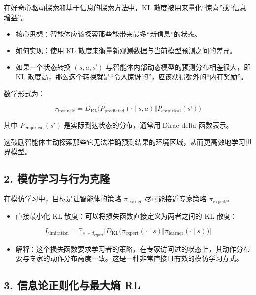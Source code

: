 在好奇心驱动探索和基于信息的探索方法中，KL 散度被用来量化``惊喜''或``信息增益''。

\begin{itemize}
\tightlist
\item
  核心思想：智能体应该探索那些能带来最多``新信息''的状态。
\item
  如何实现：使用 KL 散度来衡量新观测数据与当前模型预测之间的差异。
\item
  如果一个状态转换 \((s,a,s')\) 与智能体内部动态模型的预测分布相差很大，即 KL 散度高，那么这个转换就是``令人惊讶的''，应该获得额外的``内在奖励''。
\end{itemize}

数学形式为：

\[
r_{\mathrm{intrinsic}}
=
D_{\mathrm{KL}}\bigl(
P_{\mathrm{predicted}}(\cdot\mid s,a)
\Vert
P_{\mathrm{empirical}}(s')
\bigr)
\]

其中 \(P_{\mathrm{empirical}}(s')\) 是实际到达状态的分布，通常用 Dirac delta 函数表示。

这鼓励智能体主动探索那些它无法准确预测结果的环境区域，从而更高效地学习世界模型。

\hypertarget{ux6a21ux4effux5b66ux4e60ux4e0eux884cux4e3aux514bux9686}{%
\subsection{2. 模仿学习与行为克隆}\label{ux6a21ux4effux5b66ux4e60ux4e0eux884cux4e3aux514bux9686}}

在模仿学习中，目标是让智能体的策略 \(\pi_{\mathrm{learner}}\) 尽可能接近专家策略 \(\pi_{\mathrm{expert}}\)。

\begin{itemize}
\tightlist
\item
  直接最小化 KL 散度：可以将损失函数直接定义为两者之间的 KL 散度：
\end{itemize}

\[
L_{\mathrm{imitation}}
=
\mathbb{E}_{s\sim d_{\mathrm{expert}}}
\bigl[
D_{\mathrm{KL}}\bigl(
\pi_{\mathrm{expert}}(\cdot\mid s)
\Vert
\pi_{\mathrm{learner}}(\cdot\mid s)
\bigr)
\bigr]
\]

\begin{itemize}
\tightlist
\item
  解释：这个损失函数要求学习者的策略，在专家访问过的状态上，其动作分布要与专家的动作分布高度一致。这是一种非常直接且有效的模仿学习方式。
\end{itemize}

\hypertarget{ux4fe1ux606fux8bbaux6b63ux5219ux5316ux4e0eux6700ux5927ux71b5-rl}{%
\subsection{3. 信息论正则化与最大熵 RL}\label{ux4fe1ux606fux8bbaux6b63ux5219ux5316ux4e0eux6700ux5927ux71b5-rl}}

